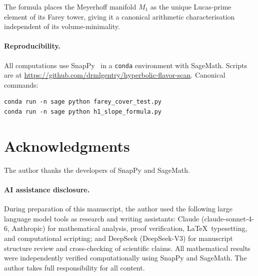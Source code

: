 \documentclass[11pt,a4paper]{article}
\theoremstyle{definition}
\begin{document}
The formula places the Meyerhoff manifold $M_1$ as the unique
Lucas-prime element of its Farey tower, giving it a canonical
arithmetic characterisation independent of its volume-minimality.

\paragraph{Reproducibility.}
All computations use SnapPy~\cite{SnapPy} in a \texttt{conda}
environment with SageMath.
Scripts are at
\url{https://github.com/drmlgentry/hyperbolic-flavor-scan}.
Canonical commands:
\begin{verbatim}
conda run -n sage python farey_cover_test.py
conda run -n sage python h1_slope_formula.py
\end{verbatim}

\section*{Acknowledgments}
The author thanks the developers of SnapPy and SageMath.

\paragraph*{AI assistance disclosure.}
During preparation of this manuscript, the author used the following
large language model tools as research and writing assistants:
Claude (claude-sonnet-4-6, Anthropic) for mathematical analysis,
proof verification, \LaTeX\ typesetting, and computational scripting;
and DeepSeek (DeepSeek-V3) for manuscript structure review and
cross-checking of scientific claims.
All mathematical results were independently verified computationally
using SnapPy and SageMath.
The author takes full responsibility for all content.
\end{document}
